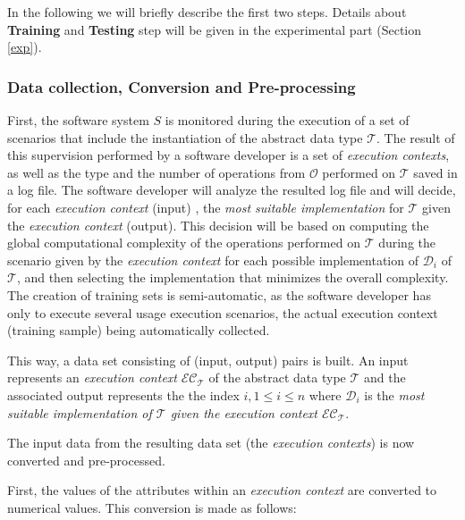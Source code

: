 In the following we will briefly describe the first two steps. Details about \textbf{Training} and \textbf{Testing} step will be given in the experimental part (Section \ref{exp}).

\subsubsection{Data collection, Conversion and Pre-processing}\label{col}

First, the software system $S$ is monitored during the execution of a set of scenarios that include the instantiation of the abstract data type $\mathcal{T}$. The result of this supervision performed by a software developer is a set of \emph{execution contexts}, as well as the type and the number of operations from $\mathcal{O}$ performed on $\mathcal{T}$ saved in a log file.
The software developer will analyze the resulted log file and will decide, for each \emph{execution context} (input) , the \emph{most suitable implementation} for $\mathcal{T}$ given the \emph{execution context} (output). This decision will be based on computing the global computational complexity of the operations performed on $\mathcal{T}$ during the scenario given by the \emph{execution context} for each possible implementation of $\mathcal{D}_i$ of $\mathcal{T}$, and then selecting the implementation that minimizes the overall complexity. The creation of training sets is semi-automatic, as the software developer has only to execute several usage execution scenarios, the actual execution context (training sample) being automatically collected.

This way, a data set consisting of (input, output) pairs is built. An input represents an \emph{execution context} $\mathcal{EC}_\mathcal{T}$ of the abstract data type $\mathcal{T}$ and the associated output represents the  the index $i, 1 \leq i \leq n$ where $\mathcal{D}_i$ is the \emph{most suitable implementation of $\mathcal{T}$ given the execution context $\mathcal{EC}_\mathcal{T}$}.

The input data from the resulting data set (the \emph{execution contexts}) is now converted and pre-processed.

First, the values of the attributes within an \emph{execution context} are converted to numerical values. This conversion is made as follows:

